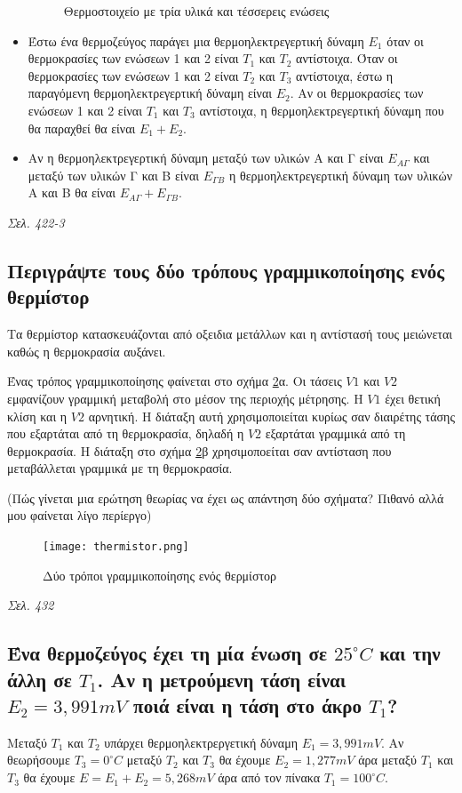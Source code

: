 \documentclass{article}
\begin{document}
\begin{itemize}
\begin{figure}[h!]
            \caption{Θερμοστοιχείο με τρία υλικά και τέσσερεις ενώσεις}
            \label{fig:7.1thermo2}
        \end{figure}
    \item Έστω ένα θερμοζεύγος παράγει μια θερμοηλεκτρεγερτική δύναμη $Ε_1$ όταν οι θερμοκρασίες των ενώσεων 1 και 2 είναι $Τ_1$ και $Τ_2$ αντίστοιχα. Όταν οι θερμοκρασίες των ενώσεων
        1 και 2 είναι $Τ_2$ και $Τ_3$ αντίστοιχα, έστω η παραγόμενη θερμοηλεκτρεγερτική δύναμη είναι $Ε_2$. Αν οι θερμοκρασίες των ενώσεων 1 και 2 είναι $Τ_1$ και $Τ_3$ αντίστοιχα, η
        θερμοηλεκτρεγερτική δύναμη που θα παραχθεί θα είναι $Ε_1+Ε_2$.
    \item Αν η θερμοηλεκτρεγερτική δύναμη μεταξύ των υλικών Α και Γ είναι $Ε_{A\Gamma}$ και μεταξύ των υλικών Γ και Β είναι $Ε_{\Gamma B}$ η θερμοηλεκτρεγερτική δύναμη των
        υλικών Α και Β θα είναι $Ε_{A\Gamma} + E_{\Gamma B}$.
\end{itemize}

\emph{Σελ. 422-3}

\subsection{Περιγράψτε τους δύο τρόπους γραμμικοποίησης ενός θερμίστορ}
Τα θερμίστορ κατασκευάζονται από οξειδια μετάλλων και η αντίστασή τους μειώνεται καθώς η θερμοκρασία αυξάνει. 

Ένας τρόπος γραμμικοποίησης φαίνεται στο σχήμα \ref{thermistor}α. Οι τάσεις $V1$ και $V2$ εμφανίζουν γραμμική μεταβολή στο μέσον της περιοχής μέτρησης. Η $V1$ έχει 
θετική κλίση και η $V2$ αρνητική. Η διάταξη αυτή χρησιμοποιείται κυρίως σαν διαιρέτης τάσης που εξαρτάται από τη θερμοκρασία, δηλαδή η $V2$ εξαρτάται γραμμικά από 
τη θερμοκρασία. Η διάταξη στο σχήμα \ref{thermistor}β χρησιμοποείται σαν αντίσταση που μεταβάλλεται γραμμικά με τη θερμοκρασία.

(Πώς γίνεται μια ερώτηση θεωρίας να έχει ως απάντηση δύο σχήματα? Πιθανό αλλά μου φαίνεται λίγο περίεργο)

\begin{figure}[h!]
    \texttt{[image: thermistor.png]}
    \caption{Δύο τρόποι γραμμικοποίησης ενός θερμίστορ}
    \label{thermistor}
\end{figure}

\emph{Σελ. 432}

\subsection{Ένα θερμοζεύγος έχει τη μία ένωση σε $25^{\circ} C$ και την άλλη σε $Τ_1$. Αν η μετρούμενη τάση είναι $E_2=3,991mV$ ποιά είναι η τάση στο άκρο $T_1$?}
Μεταξύ $Τ_1$ και $Τ_2$ υπάρχει θερμοηλεκτρεργετική δύναμη $Ε_1 = 3,991 mV$. Αν θεωρήσουμε $T_3 = 0^{\circ}C$ μεταξύ $T_2$ και $T_3$ θα έχουμε $E_2 = 1,277mV$ άρα μεταξύ 
$T_1$ και $T_3$ θα έχουμε $E = E_1 + E_2 = 5,268mV$ άρα από τον πίνακα $T_1 = 100^{\circ}C$.
\end{document}

